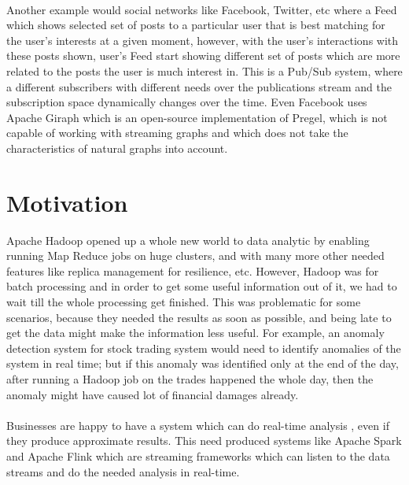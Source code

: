 \documentclass[12pt]{report}
\numberwithin{figure}{section}
\numberwithin{table}{section}
\begin{document}
\paragraph{}

Another example would social networks like Facebook, Twitter, etc where a Feed which shows selected set of posts to a particular user that is best matching for the user’s interests at a given moment, however, with the user’s interactions with these posts shown, user’s Feed start showing different set of posts which are more related to the posts the user is much interest in. This is a Pub/Sub system, where a different subscribers with different needs over the publications stream and the subscription space dynamically changes over the time\cite{Horawalavithana}. Even Facebook uses\cite{Facebook} Apache Giraph which is an open-source implementation of Pregel\cite{Pregel}, which is not capable of working with streaming graphs and which does not take the characteristics of natural graphs into account. 

\section{Motivation}

Apache Hadoop opened up a whole new world to data analytic by enabling running Map Reduce jobs on huge clusters, and with many more other needed features like replica management for resilience, etc. However, Hadoop was for batch processing and in order to get some useful information out of it, we had to wait till the whole processing get finished. This was problematic for some scenarios, because they needed the results as soon as possible, and being late to get the data might make the information less useful. For example, an anomaly detection system for stock trading system would need to identify anomalies of the system in real time; but if this anomaly was identified only at the end of the day, after running a Hadoop job on the trades happened the whole day, then the anomaly might have caused lot of financial damages already. 

\paragraph{}

Businesses are happy to have a system which can do real-time analysis \cite{Vitria}, even if they produce approximate results. This need produced systems like Apache Spark and Apache Flink which are streaming frameworks which can listen to the data streams and do the needed  analysis in real-time. 
\end{document}
